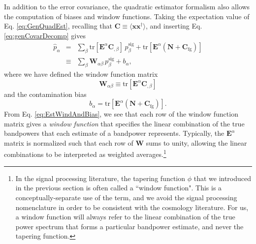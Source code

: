 \documentclass[twocolumn,aps,prd,nofootinbib,showpacs]{revtex4-1}
\begin{document}
In addition to the error covariance, the quadratic estimator formalism also allows the computation of biases and window functions.  Taking the expectation value of  Eq. \eqref{eq:GenQuadEst}, recalling that $\mathbf{C} \equiv \langle \mathbf{x} \mathbf{x}^\dagger \rangle$, and inserting  Eq. \eqref{eq:genCovarDecomp} gives
\begin{eqnarray}
\widehat{p}_\alpha &=& \sum_\beta \textrm{tr} [\mathbf{E}^\alpha \mathbf{C}_{,\beta} ] \,p_\beta^\textrm{sig} + \textrm{tr}  [\mathbf{E}^\alpha (\mathbf{N}+ \mathbf{C}_\textrm{fg})] \nonumber \\
&\equiv& \sum_\beta \mathbf{W}_{\alpha \beta} \,p_\beta^\textrm{sig} + b_\alpha, \label{eq:EstWindAndBias}
\end{eqnarray}
where we have defined the window function matrix
\begin{equation}
\label{eq:WindGeneral}
\mathbf{W}_{\alpha \beta} \equiv \textrm{tr} [\mathbf{E}^\alpha \mathbf{C}_{,\beta} ] 
\end{equation}
and the contamination bias
\begin{equation}
\label{eq:bias}
b_\alpha = \textrm{tr}  [\mathbf{E}^\alpha (\mathbf{N}+ \mathbf{C}_\textrm{fg})] .
\end{equation}
From  Eq. \eqref{eq:EstWindAndBias}, we see that each row of the window function matrix gives a \emph{window function} that specifies the linear combination of the true bandpowers that each estimate of a bandpower represents.  Typically, the $\mathbf{E}^\alpha$ matrix is normalized such that each row of $\mathbf{W}$ sums to unity, allowing the linear combinations to be interpreted as weighted averages.\footnote{In the signal processing literature, the tapering function $\phi$ that we introduced in the previous section is often called a ``window function".  This is a conceptually-separate use of the term, and we avoid the signal processing nomenclature in order to be consistent with the cosmology literature.  For us, a window function will always refer to the linear combination of the true power spectrum that forms a particular bandpower estimate, and never the tapering function.}
\end{document}
